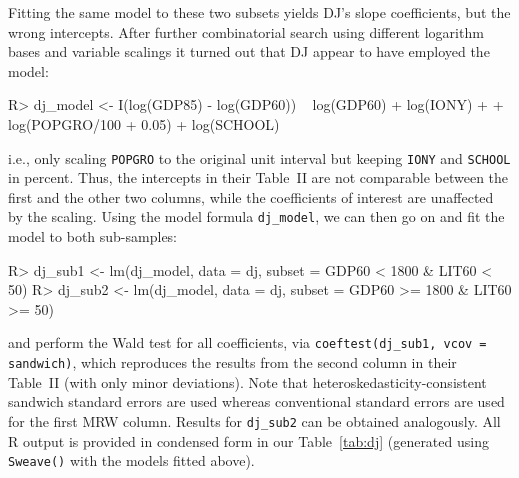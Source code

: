 \documentclass[10pt,a4paper,twoside]{article}
\let\code=\texttt
\let\pkg=\textbf
\let\proglang=\textsf
\newenvironment{Schunk}{}{}
\begin{document}
Fitting the same model to these two subsets yields DJ's slope
coefficients, but the wrong intercepts. After further combinatorial search
using different logarithm bases and variable scalings it turned out that DJ 
appear to have employed the model: 
%
\begin{Schunk}
\begin{Sinput}
R> dj_model <- I(log(GDP85) - log(GDP60)) ~ log(GDP60) + log(IONY) +
+    log(POPGRO/100 + 0.05) + log(SCHOOL)
\end{Sinput}
\end{Schunk}
%
i.e., only scaling \code{POPGRO} to the original unit interval but keeping \code{IONY}
and \code{SCHOOL} in percent. Thus, the intercepts in their Table~II are not comparable
between the first and the other two columns, while the coefficients of interest are
unaffected by the scaling. Using the model formula \code{dj\_model}, we can then go on
and fit the model to both sub-samples:
%
\begin{Schunk}
\begin{Sinput}
R> dj_sub1 <- lm(dj_model, data = dj, subset = GDP60 <  1800 & LIT60 <  50)
R> dj_sub2 <- lm(dj_model, data = dj, subset = GDP60 >= 1800 & LIT60 >= 50)
\end{Sinput}
\end{Schunk}
%
%
%
and perform the Wald test for all coefficients, via \code{coeftest(dj\_sub1, vcov = sandwich)},
which reproduces the results from the second column in their Table~II (with only
minor deviations). Note that heteroskedasticity-consistent sandwich
standard errors are used
\citep[provided by package \pkg{sandwich} in \proglang{R}, see][]{repro:Zeileis:2004,repro:Zeileis:2006}
whereas conventional standard errors are used for the first MRW column.
Results for \code{dj\_sub2} can be obtained analogously.
All \proglang{R} output is provided in condensed form
in our Table~\ref{tab:dj} (generated using \code{Sweave()}
with the models fitted above). 
\end{document}
